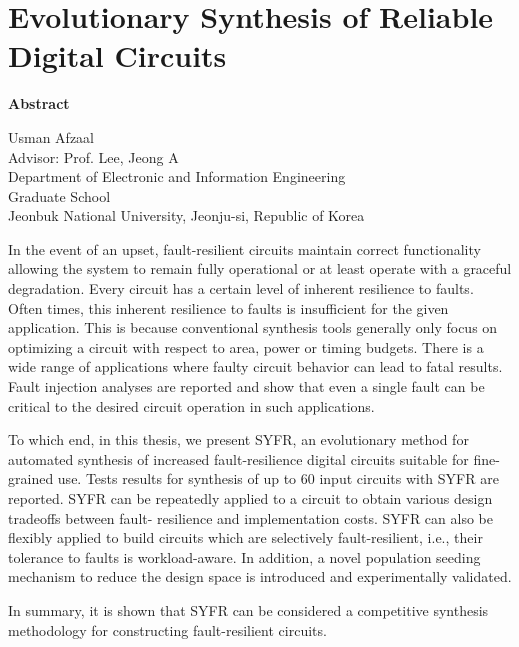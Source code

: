 \newpage
\section*{Evolutionary Synthesis of Reliable Digital Circuits}

\bigskip
\bigskip
\centerline{\Large{\bf Abstract}}
\bigskip

\begin{flushright}
Usman Afzaal\\
Advisor: Prof. Lee, Jeong A\\
Department of Electronic and Information Engineering\\
Graduate School\\
Jeonbuk National University, Jeonju-si, Republic of Korea\\
\end{flushright}

In the event of an upset, fault-resilient circuits
maintain correct functionality allowing the system to remain fully
operational or at least operate with a graceful degradation. Every
circuit has a certain level of inherent resilience to faults. Often
times, this inherent resilience to faults is insufficient for the given
application. This is because conventional synthesis tools generally
only focus on optimizing a circuit with respect to area, power or
timing budgets. There is a wide range of applications where faulty
circuit behavior can lead to fatal results. Fault injection analyses
are reported and show that even a single fault can be critical to
the desired circuit operation in such applications.

To which end, in this thesis, we present SYFR, an evolutionary method
for automated synthesis of increased fault-resilience digital circuits
suitable for fine-grained use. Tests results for synthesis of up to 60
input circuits with SYFR are reported. SYFR can be repeatedly applied
to a circuit to obtain various design tradeoffs between fault-
resilience and implementation costs. SYFR can also be flexibly
applied to build circuits which are selectively fault-resilient,
i.e., their tolerance to faults is workload-aware. In addition, a
novel population seeding mechanism to reduce the design space
is introduced and experimentally validated.

In summary, it is shown that SYFR can be considered a competitive
synthesis methodology for constructing fault-resilient circuits.
